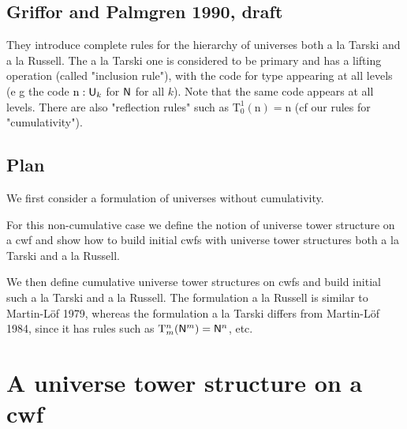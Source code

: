 \documentclass{lmcs}
\newcommand{\Ta}{\mathrm{T}}
\begin{document}
\subsection*{Griffor and Palmgren 1990, draft}

They introduce complete rules for the hierarchy of universes both a la Tarski and a la Russell. The a la Tarski one is considered to be primary and has a lifting operation (called "inclusion rule"), with the code for type appearing at all levels (e g the code $\mathrm{n} : \mathsf{U}_k$ for $\mathsf{N}$ for all $k$). Note that the same code appears at all levels. There are also "reflection rules" such as $\Ta_0^1(\mathrm{n}) = \mathrm{n}$ (cf our rules for "cumulativity"). 

\subsection*{Plan}

We first consider a formulation of universes without cumulativity. 

For this non-cumulative case we define the notion of universe tower structure on a cwf and show how to build initial cwfs with universe tower structures both a la Tarski and a la Russell. 

We then define cumulative universe tower structures on cwfs and build initial such a la Tarski and a la Russell. The formulation a la Russell is similar to Martin-Löf 1979, whereas the formulation a la Tarski differs from Martin-Löf 1984, since it has rules such as $\Ta_m^n(\N^m) = \N^n$, etc.

\section{A universe tower structure on a cwf}
\end{document}
